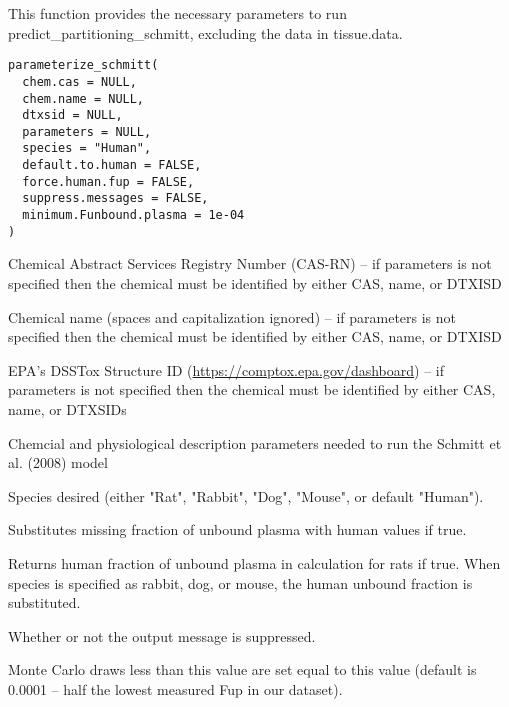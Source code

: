 \documentclass[a4paper]{book}
\begin{document}
%
\begin{Description}\relax
This function provides the necessary parameters to run
predict\_partitioning\_schmitt, excluding the data in tissue.data.
\end{Description}
%
\begin{Usage}
\begin{verbatim}
parameterize_schmitt(
  chem.cas = NULL,
  chem.name = NULL,
  dtxsid = NULL,
  parameters = NULL,
  species = "Human",
  default.to.human = FALSE,
  force.human.fup = FALSE,
  suppress.messages = FALSE,
  minimum.Funbound.plasma = 1e-04
)
\end{verbatim}
\end{Usage}
%
\begin{Arguments}
\begin{ldescription}
\item[\code{chem.cas}] Chemical Abstract Services Registry Number (CAS-RN) -- if
parameters is not specified then the chemical must be identified by either
CAS, name, or DTXISD

\item[\code{chem.name}] Chemical name (spaces and capitalization ignored) --  if
parameters is not specified then the chemical must be identified by either
CAS, name, or DTXISD

\item[\code{dtxsid}] EPA's DSSTox Structure ID (\url{https://comptox.epa.gov/dashboard})
-- if parameters is not specified then the chemical must be identified by 
either CAS, name, or DTXSIDs

\item[\code{parameters}] Chemcial and physiological description parameters needed
to run the Schmitt et al. (2008) model

\item[\code{species}] Species desired (either "Rat", "Rabbit", "Dog", "Mouse", or
default "Human").

\item[\code{default.to.human}] Substitutes missing fraction of unbound plasma with
human values if true.

\item[\code{force.human.fup}] Returns human fraction of unbound plasma in
calculation for rats if true.
When species is specified as rabbit, dog, or mouse, the human unbound
fraction is substituted.

\item[\code{suppress.messages}] Whether or not the output message is suppressed.

\item[\code{minimum.Funbound.plasma}] Monte Carlo draws less than this value are set 
equal to this value (default is 0.0001 -- half the lowest measured Fup in our
dataset).
\end{ldescription}
\end{Arguments}
\end{document}
